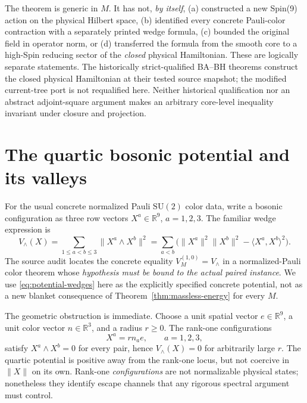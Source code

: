 \begin{remark}
The theorem is generic in \(M\). It has not, \emph{by itself},
(a) constructed a new Spin(9) action on the physical Hilbert space,
(b) identified every concrete Pauli-color contraction with a separately
printed wedge formula, (c) bounded the original field in operator norm,
or (d) transferred the formula from the smooth core to a high-Spin reducing
sector of the \emph{closed} physical Hamiltonian.
These are logically separate statements. The historically strict-qualified
BA--BH theorems construct the closed physical Hamiltonian at their tested
source snapshot; the modified current-tree port is not requalified here.
Neither historical qualification nor an abstract adjoint-square argument
makes an arbitrary core-level inequality invariant under closure and projection.
\end{remark}

\section{The quartic bosonic potential and its valleys}
For the usual concrete normalized Pauli \(\mathrm{SU}(2)\) color data,
write a bosonic configuration as three row vectors
\(X^a\in\mathbb R^9\), \(a=1,2,3\). The familiar wedge expression is
\begin{equation}\label{eq:potential-wedges}
 V_{\wedge}(X)=\sum_{1\le a<b\le3}\|X^a\wedge X^b\|^2
 =\sum_{a<b}\bigl(\|X^a\|^2\|X^b\|^2-\langle X^a,X^b\rangle^2\bigr).
\end{equation}
The source audit locates the concrete equality
\(V_M^{(1,0)}=V_{\wedge}\) in a normalized-Pauli color theorem whose
\emph{hypothesis must be bound to the actual paired instance}. We use
\eqref{eq:potential-wedges} here as the explicitly specified concrete
potential, not as a new blanket consequence of
Theorem~\ref{thm:massless-energy} for every \(M\).

The geometric obstruction is immediate. Choose a unit spatial vector
\(e\in\mathbb R^9\), a unit color vector \(n\in\mathbb R^3\), and a
radius \(r\ge0\). The rank-one configurations
\begin{equation}\label{eq:flat-valley}
  X^a=r n_a e,\qquad a=1,2,3,
\end{equation}
satisfy \(X^a\wedge X^b=0\) for every pair, hence
\(V_{\wedge}(X)=0\) for arbitrarily large \(r\). The quartic potential
is positive away from the rank-one locus, but not coercive in \(\|X\|\)
on its own. Rank-one \emph{configurations} are not normalizable physical
states; nonetheless they identify escape channels that any rigorous
spectral argument must control.

